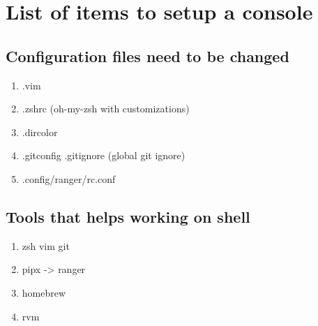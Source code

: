 \chapter{List of items to setup a console}

\section{Configuration files need to be changed}
\begin{enumerate}
	\item .vim
	\item .zshrc (oh-my-zsh with customizations)
	\item .dircolor
  \item .gitconfig .gitignore (global git ignore)
  \item .config/ranger/rc.conf

\end{enumerate}

\section{Tools that helps working on shell}
\begin{enumerate}
  \item zsh vim git
  \item pipx -> ranger
  \item homebrew
  \item rvm
\end{enumerate}
